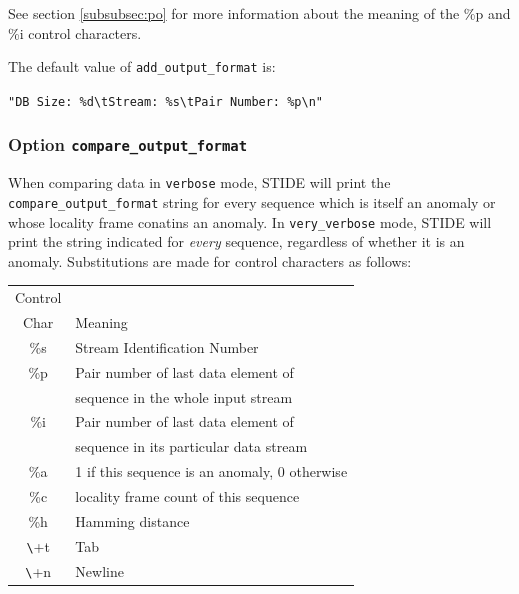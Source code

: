 \documentclass{amsart}
\begin{document}
\vspace{.15in}

See section \ref{subsubsec:po} for more information about the meaning
of the \%p and \%i control characters.

The default value of {\tt add\_output\_format} is:

\vspace{5pt}

\verb+"DB Size: %d\tStream: %s\tPair Number: %p\n"+
  
\subsubsection{Option {\tt compare\_output\_format}} \label{subsubsec:cof}
When comparing data in {\tt verbose} mode, STIDE will print the 
{\tt compare\_output\_format} string for every sequence which is
itself an anomaly or whose locality frame conatins an anomaly.  In
{\tt very\_verbose} mode, STIDE will print the string indicated for
{\it every} sequence, regardless of whether it is an anomaly.
Substitutions are made for control characters as follows:

\vspace{.15in}

\begin{tabular}{c|l}
\vspace{-4pt}
Control \\ Char &  Meaning \\ \hline
       \%s  & Stream Identification Number \\
\vspace{-4pt}
       \%p  & Pair number of last data element of \\
            & sequence in the whole input stream \\
\vspace{-4pt}
       \%i  & Pair number of last data element of \\
            & sequence in its particular data stream  \\
       \%a  & 1 if this sequence is an anomaly, 0 otherwise  \\
       \%c  & locality frame count of this sequence  \\
       \%h  & Hamming distance \\
       \verb+\+t & Tab    \\
       \verb+\+n & Newline    \\
\end{tabular}

\vspace{.15in}
\end{document}
